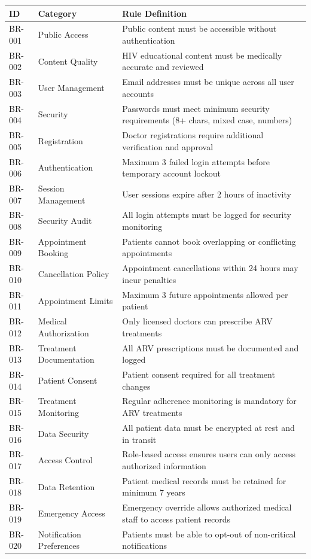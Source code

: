 \documentclass[12pt,a4paper]{article}
\begin{document}
\begin{longtable}{|p{2cm}|p{3cm}|p{9cm}|}
\hline
\textbf{ID} & \textbf{Category} & \textbf{Rule Definition} \\
\hline
BR-001 & Public Access & Public content must be accessible without authentication \\
\hline
BR-002 & Content Quality & HIV educational content must be medically accurate and reviewed \\
\hline
BR-003 & User Management & Email addresses must be unique across all user accounts \\
\hline
BR-004 & Security & Passwords must meet minimum security requirements (8+ chars, mixed case, numbers) \\
\hline
BR-005 & Registration & Doctor registrations require additional verification and approval \\
\hline
BR-006 & Authentication & Maximum 3 failed login attempts before temporary account lockout \\
\hline
BR-007 & Session Management & User sessions expire after 2 hours of inactivity \\
\hline
BR-008 & Security Audit & All login attempts must be logged for security monitoring \\
\hline
BR-009 & Appointment Booking & Patients cannot book overlapping or conflicting appointments \\
\hline
BR-010 & Cancellation Policy & Appointment cancellations within 24 hours may incur penalties \\
\hline
BR-011 & Appointment Limits & Maximum 3 future appointments allowed per patient \\
\hline
BR-012 & Medical Authorization & Only licensed doctors can prescribe ARV treatments \\
\hline
BR-013 & Treatment Documentation & All ARV prescriptions must be documented and logged \\
\hline
BR-014 & Patient Consent & Patient consent required for all treatment changes \\
\hline
BR-015 & Treatment Monitoring & Regular adherence monitoring is mandatory for ARV treatments \\
\hline
BR-016 & Data Security & All patient data must be encrypted at rest and in transit \\
\hline
BR-017 & Access Control & Role-based access ensures users can only access authorized information \\
\hline
BR-018 & Data Retention & Patient medical records must be retained for minimum 7 years \\
\hline
BR-019 & Emergency Access & Emergency override allows authorized medical staff to access patient records \\
\hline
BR-020 & Notification Preferences & Patients must be able to opt-out of non-critical notifications \\
\hline
\end{longtable}
\end{document}
